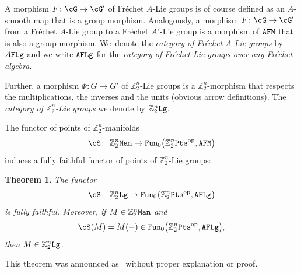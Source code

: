 \documentclass[10pt,a4paper]{amsart}
\newcommand{\op}[1]{\operatorname{#1}}
\newcommand{\Z}{{\mathbb Z}}
\newcommand{\0}{\otimes}
\newcommand{\z}{\Z_2^n}
\numberwithin{equation}{section}
\newtheorem{Theorem}{Theorem}[section]
\begin{document}
A morphism $F\colon \cG\to \cG'$ of Fr\'echet $A$-Lie groups is of course defined as an $A$-smooth map that is a group morphism. Analogously, a morphism $F\colon \cG\to \cG'$ from a Fr\'echet $A$-Lie group to a Fr\'echet $A'$-Lie group is a morphism of $\tt AFM$ that is also a group morphism. We~denote the {\it category of Fr\'echet $A$-Lie groups} by $A\tt FLg$ and we write $\tt AFLg$ for the {\it category of Fr\'echet Lie groups over any Fr\'echet algebra}.

Further, a morphism $\Phi\colon G\to G'$ of $\z$-Lie groups is a $\z$-morphism that respects the multiplications, the inverses and the units (obvious arrow definitions). The {\it category of $\z$-Lie groups} we denote by $\z\tt Lg$.

The functor of points of $\z$-manifolds
\begin{gather}\label{SMan}
\cS\colon\ \z{\tt Man}\to {\tt Fun}_0\big(\z{\tt Pts}^{\op{op}},{\tt AFM}\big)
\end{gather}
induces a fully faithful functor of points of $\z$-Lie groups:

\begin{Theorem}\label{FunPtsZLg}
The functor
\begin{gather}\label{ResSLg}
\cS\colon\ \z{\tt Lg}\to {\tt Fun}_0\big(\z{\tt Pts}^{\op{op}},{\tt AFLg}\big)
\end{gather}
is fully faithful. Moreover, if $M\in\z{\tt Man}$ and
\[
\cS(M)=M(-)\in{\tt Fun}_0\big(\z{\tt Pts}^{\op{op}},{\tt AFLg}\big),
\]
then $M\in\z{\tt Lg}$. \end{Theorem}

This theorem was announced as~\cite[Theorem 3.30]{Bruce:2019b} without proper explanation or proof.
\end{document}
